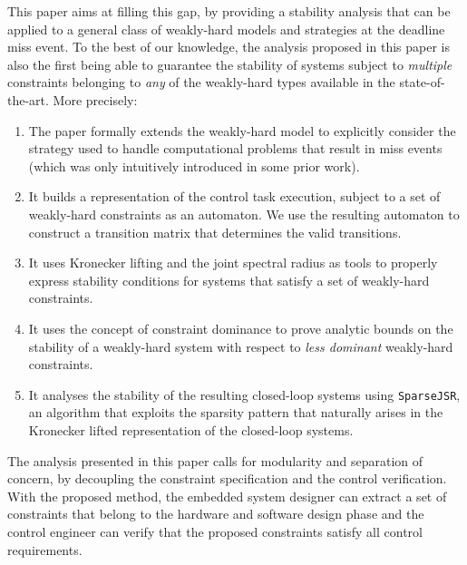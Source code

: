 This paper aims at filling this gap, by providing a stability analysis that can be applied to a general class of weakly-hard models and strategies at the deadline miss event.
To the best of our knowledge, the analysis proposed in this paper is also the first being able to guarantee the stability of systems subject to \emph{multiple} constraints belonging to \emph{any} of the weakly-hard types available in the state-of-the-art.
More precisely:
\begin{enumerate}[label=(\roman*)]
    \item The paper formally extends the weakly-hard model to explicitly consider the strategy used to handle computational problems that result in miss events (which was only intuitively introduced in some prior work).
    \item It builds a representation of the control task execution, subject to a set of weakly-hard constraints as an automaton. We use the resulting automaton to construct a transition matrix that determines the valid transitions.
    \item It uses Kronecker lifting and the joint spectral radius as tools to properly express stability conditions for systems that satisfy a set of weakly-hard constraints.
    \item It uses the concept of constraint dominance to prove analytic bounds on the stability of a weakly-hard system with respect to \emph{less dominant} weakly-hard constraints.
    \item It analyses the stability of the resulting closed-loop systems using \texttt{SparseJSR}, an algorithm that exploits the sparsity pattern that naturally arises in the Kronecker lifted representation of the closed-loop systems.
\end{enumerate}

The analysis presented in this paper calls for modularity and separation of concern, by decoupling the constraint specification and the control verification. 
With the proposed method, the embedded system designer can extract a set of constraints that belong to the hardware and software design phase and the control engineer can verify that the proposed constraints satisfy all control requirements. 
